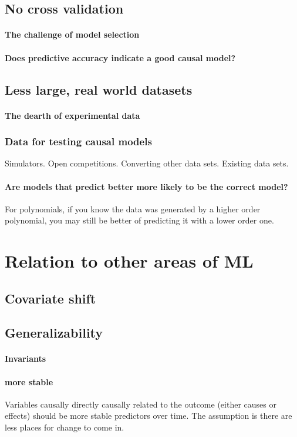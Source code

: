 \documentclass[11pt,a4paper,oneside]{book}
\begin{document}
\subsection*{No cross validation}
\paragraph*{The challenge of model selection}
\paragraph*{Does predictive accuracy indicate a good causal model?}
\subsection*{Less large, real world datasets}
\paragraph*{The dearth of experimental data}
\subsubsection*{Data for testing causal models}
Simulators. Open competitions. Converting other data sets. Existing data sets.

\paragraph*{Are models that predict better more likely to be the correct model?}
For polynomials, if you know the data was generated by a higher order polynomial, you may still be better of predicting it with a lower order one.

\section*{Relation to other areas of ML}
\subsection*{Covariate shift}
\subsection*{Generalizability}
\paragraph*{Invariants}
\paragraph{more stable} Variables causally directly causally related to the outcome (either causes or effects) should be more stable predictors over time. The assumption is there are less places for change to come in. 
\end{document}
